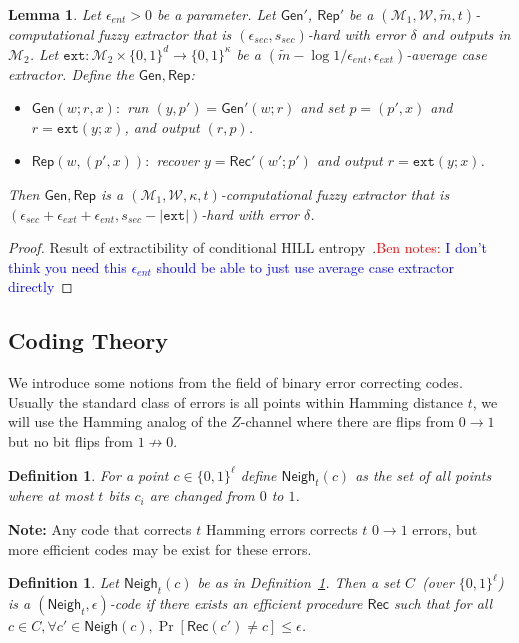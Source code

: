 \documentclass[11pt]{article}
\newcommand{\defref}[1]{\mbox{Definition~\ref{#1}}}
\newcommand{\class}[1]{{\ensuremath{\mathsf{#1}}}}
\newcommand{\gen}{\ensuremath{\class{Gen}}\xspace}
\newcommand{\rep}{\ensuremath{\class{Rep}}\xspace}
\newcommand{\rec}{\ensuremath{\class{Rec}}\xspace}
\newcommand{\zo}{\ensuremath{\{0, 1\}}}
\newcommand{\neigh}{\ensuremath{\class{Neigh}}\xspace}
\newcommand{\ext}{\ensuremath{\mathtt{ext}}}
\newtheorem{lemma}[theorem]{Lemma}
\newtheorem{definition}[theorem]{Definition}
\newcommand{\authnote}[2]{{\textcolor{red}{\textsf{#1 notes: }\textcolor{blue}{ #2}}\marginpar{\textcolor{red}{\textbf{!!!!!}}}}}
\newcommand{\authnote}[2]{}
\newcommand{\bnote}[1]{{\authnote{Ben}{#1}}}
\begin{document}
\begin{lemma}
\label{lem:cond and ext}
Let $\epsilon_{ent} >0$ be a parameter.  Let $\gen'$, $\rep'$ be a $(\mathcal{M}_1, \mathcal{W}, \tilde{m}, t)$-computational fuzzy extractor that is $(\epsilon_{sec}, s_{sec})$-hard with error $\delta$ and outputs in $\mathcal{M}_2$.  Let $\ext:\mathcal{M}_2\times \zo^d\rightarrow \zo^\kappa$ be a $(\tilde{m} - \log 1/\epsilon_{ent}, \epsilon_{ext})$-average case extractor.  Define the $\gen, \rep$:
\begin{itemize}
\item $\gen(w; r, x):$ run $(y, p')= \gen'(w; r)$ and set $p = (p', x)$ and $r = \ext(y; x)$,  and output $(r, p)$.
\item $\rep(w, (p', x)):$ recover $y = \rec'(w'; p')$ and output $r = \ext(y; x)$. 
\end{itemize}
Then $\gen, \rep$ is a $(\mathcal{M}_1, \mathcal{W}, \kappa, t)$-computational fuzzy extractor that is $(\epsilon_{sec}+\epsilon_{ext}+\epsilon_{ent}, s_{sec} - |\ext|)$-hard with error $\delta$.
\end{lemma}
\begin{proof}
Result of extractibility of conditional HILL entropy~\cite[Lemma 5]{DBLP:conf/eurocrypt/HsiaoLR07}.\bnote{I don't think you need this $\epsilon_{ent}$ should be able to just use average case extractor directly}
\end{proof}

\subsection{Coding Theory}
\label{sec:coding theory}
We introduce some notions from the field of binary error correcting codes.  Usually the standard class of errors  is all points within Hamming distance $t$, we will use the Hamming analog of the $Z$-channel where there are flips from $0\rightarrow 1$ but no bit flips from $1\not\rightarrow 0$.
\begin{definition}
\label{def:hamming z channel}
For a point $c\in \zo^\ell$ define $\neigh_t(c) $ as the set of all points where at most $t$ bits $c_i$ are changed from $0$ to $1$. 
\end{definition}
\textbf{Note:} Any code that corrects $t$ Hamming errors corrects $t$ $0\rightarrow 1$ errors, but more efficient codes may be exist for these errors.

\begin{definition}
Let $\neigh_t(c)$ be as in \defref{def:hamming z channel}.  Then a set $C$~(over $\zo^\ell$) is a $(\neigh_t, \epsilon)$-code if there exists an efficient procedure $\rec$ such that for all $c\in C, \forall c'\in \neigh(c), \Pr[\rec(c') \neq c] \leq \epsilon$.
\end{definition}
\end{document}
